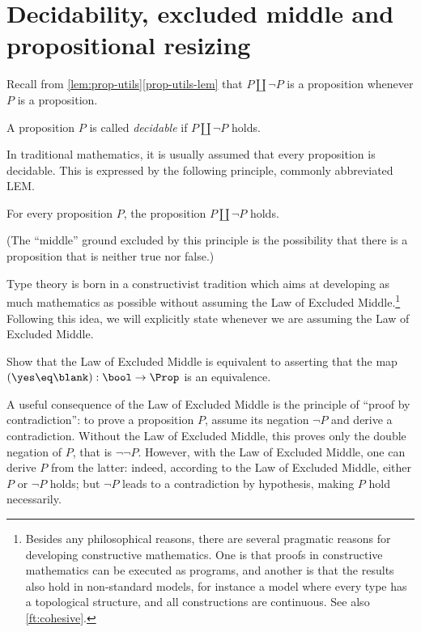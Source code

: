 \section{Decidability, excluded middle and propositional resizing}
\label{sec:decidability}

Recall from \cref{lem:prop-utils}\ref{prop-utils-lem} that $P\amalg \neg P$ is a proposition whenever $P$ is a proposition.
\begin{definition}\label{def:decidability}
  A proposition $P$ is called \emph{decidable}
  if $P\amalg\neg P$ holds.
\end{definition}
In traditional mathematics, it is usually assumed that
every proposition is decidable.
This is expressed by the following principle, commonly abbreviated LEM.
\begin{principle}
  \label{pri:lem}%
  For every proposition $P$, the proposition $P \amalg \neg P$ holds.
\end{principle}

(The ``middle'' ground excluded by this principle is the possibility that there
is a proposition that is neither true nor false.)

Type theory is born
in a constructivist tradition
which aims at developing as much mathematics as
possible without assuming the Law of Excluded Middle.\footnote{%
  Besides any philosophical reasons,
  there are several pragmatic reasons
  for developing constructive mathematics.
  One is that proofs in constructive mathematics
  can be executed as programs,
  and another is that the results also hold in non-standard models,
  for instance a model where every type has a topological structure,
  and all constructions are continuous.
  See also \cref{ft:cohesive}.}
Following this idea, we will
explicitly state whenever we are assuming the Law of Excluded Middle.
\begin{xca}\label{xca:lem-prop}
  Show that the Law of Excluded Middle is equivalent to asserting
  that the map $(\yes \eq \blank) : \bool \to \Prop$
  is an equivalence.
\end{xca}
A useful consequence of the Law of Excluded Middle is the principle of
``proof by contradiction'': to prove a proposition $P$,
assume its negation $\neg P$ and derive a contradiction.
Without the Law of Excluded Middle, this proves only the double negation of
$P$, that is $\neg \neg P$.  However, with the Law of Excluded Middle,
one can derive $P$ from the latter: indeed, according to the
Law of Excluded Middle, either $P$ or $\neg P$ holds;
but $\neg P$ leads to a contradiction by hypothesis, making $P$ hold
necessarily.


